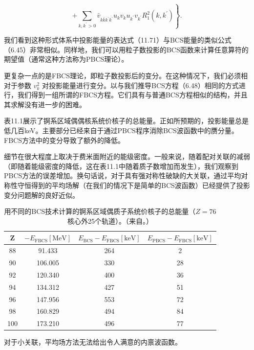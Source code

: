\[
\left.{+\mathop{\sum}\limits_{{k,{k}^{\prime}>0}}{\bar{v}}_{k\bar{k}{k}^{\prime}\overline{{k}^{\prime}}}{u}_{k}{v}_{k}{u}_{{k}^{\prime}}{v}_{{k}^{\prime}}{R}^{2}_{1}\left({k,{k}^{\prime}}\right)}\right\} .\tag{11.71}
\]

我们看到这种形式体系中投影能量的表达式（11.71）与BCS能量的类似公式（6.45）非常相似。同样地，我们可以用粒子数投影的BCS函数来计算任意算符的期望值（通常这种方法称为PBCS理论）。

更复杂一点的是FBCS理论，即粒子数投影后的变分。在这种情况下，我们必须相对于参数 ${v}^{2}_{k}$ 对投影能量进行变分。以与我们推导BCS方程（6.48）相同的方式进行，我们得到一组所谓的FBCS方程\cite{DMP64}。它们具有与普通BCS方程相似的结构，并且其求解没有进一步的困难。

表11.1展示了锕系区域偶偶核系统价核子的总能量。正如所预期的，投影能量总是低几百keV。主要部分已经来自于通过PBCS程序消除BCS波函数中的赝分量。FBCS方法中的变分导致了额外的降低。

细节在很大程度上取决于费米面附近的能级密度。一般来说，随着配对关联的减弱（即随着能级密度的降低，这在表11.1中随着质子数增加而发生），我们观察到PBCS方法的误差增加。换句话说，对于具有强对称性破缺的大关联，通过平均对称性守恒得到的平均场解（在我们的情况下是简单的BCS波函数）已经提供了投影变分问题解的良好近似。

\begin{table}[H]
\begin{centering}
\caption{\label{tab:11_1}用不同的BCS技术计算的锕系区域偶质子系统价核子的总能量（$Z=76$核心外25个轨道）。（来自\cite{MPR65}。）}
\par\end{centering}
\centering{}%
\begin{tabular}{|c|c|c|c|}
\hline 
Z & $-{E}_{\mathrm{{FBCS}}}\left\lbrack \mathrm{{MeV}}\right\rbrack $ & ${E}_{\mathrm{{BCS}}}-{E}_{\mathrm{{FBCS}}}\left\lbrack \mathrm{{keV}}\right\rbrack $ & ${E}_{\mathrm{{PBCS}}}-{E}_{\mathrm{{FBCS}}}\left\lbrack \mathrm{{keV}}\right\rbrack $\tabularnewline
\hline 
88 & 91.433 & 264 & 2\tabularnewline
\hline 
90 & 106.005 & 330 & 28\tabularnewline
\hline 
92 & 120.340 & 400 & 36\tabularnewline
\hline 
94 & 134.312 & 427 & 51\tabularnewline
\hline 
96 & 147.956 & 553 & 72\tabularnewline
\hline 
98 & 160.829 & 494 & 84\tabularnewline
\hline 
100 & 173.210 & 496 & 77\tabularnewline
\hline 
\end{tabular}
\end{table}

对于小关联，平均场方法无法给出令人满意的内禀波函数。

